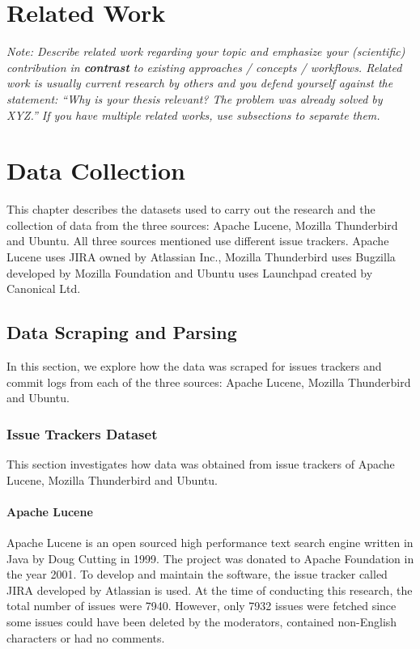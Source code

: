 \documentclass[a4paper,12pt,twoside]{report}
\begin{document}
\chapter{Related Work}

\textit{Note: Describe related work regarding your topic and emphasize your (scientific) contribution in \textbf{contrast} to existing approaches / concepts / workflows. Related work is usually current research by others and you defend yourself against the statement: ``Why is your thesis relevant? The problem was already solved by XYZ.'' If you have multiple related works, use subsections to separate them.}





\chapter{Data Collection}

This chapter describes the datasets used to carry out the research and the collection of data from the three sources: Apache Lucene, Mozilla Thunderbird and Ubuntu. All three sources mentioned use different issue trackers. Apache Lucene uses JIRA owned by Atlassian Inc., Mozilla Thunderbird uses Bugzilla developed by Mozilla Foundation and Ubuntu uses Launchpad created by Canonical Ltd. 

\section{Data Scraping and Parsing}

In this section, we explore how the data was scraped for issues trackers and commit logs from each of the three sources: Apache Lucene, Mozilla Thunderbird and Ubuntu. 

\subsection{Issue Trackers Dataset}
This section investigates how data was obtained from issue trackers of Apache Lucene, Mozilla Thunderbird and Ubuntu. 

\subsubsection{Apache Lucene}
Apache Lucene is an open sourced high performance text search engine written in Java by Doug Cutting in 1999. The project was donated to Apache Foundation in the year 2001. To develop and maintain the software, the issue tracker called JIRA developed by Atlassian is used. At the time of conducting this research, the total number of issues were 7940. However, only 7932 issues were fetched since some issues could have been deleted by the moderators, contained non-English characters or had no comments.
\end{document}
